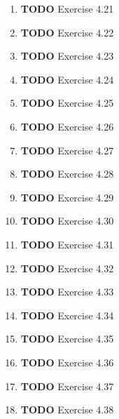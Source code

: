 \documentclass[11pt]{article}
\begin{document}
\begin{enumerate}
\begin{enumerate}
\item {\bfseries\sffamily TODO} Exercise 4.21
\label{sec:orgcb80988}

\item {\bfseries\sffamily TODO} Exercise 4.22
\label{sec:orgb987f28}

\item {\bfseries\sffamily TODO} Exercise 4.23
\label{sec:org85c966d}

\item {\bfseries\sffamily TODO} Exercise 4.24
\label{sec:orgdd5f2ce}

\item {\bfseries\sffamily TODO} Exercise 4.25
\label{sec:orgd80fada}

\item {\bfseries\sffamily TODO} Exercise 4.26
\label{sec:org2371de7}

\item {\bfseries\sffamily TODO} Exercise 4.27
\label{sec:orge171b40}

\item {\bfseries\sffamily TODO} Exercise 4.28
\label{sec:org1bc0853}

\item {\bfseries\sffamily TODO} Exercise 4.29
\label{sec:org37179b7}

\item {\bfseries\sffamily TODO} Exercise 4.30
\label{sec:org4f55e4c}

\item {\bfseries\sffamily TODO} Exercise 4.31
\label{sec:org8599291}

\item {\bfseries\sffamily TODO} Exercise 4.32
\label{sec:org86470d2}

\item {\bfseries\sffamily TODO} Exercise 4.33
\label{sec:org6365de0}

\item {\bfseries\sffamily TODO} Exercise 4.34
\label{sec:orge858066}

\item {\bfseries\sffamily TODO} Exercise 4.35
\label{sec:org0a099a0}

\item {\bfseries\sffamily TODO} Exercise 4.36
\label{sec:orgd140d75}

\item {\bfseries\sffamily TODO} Exercise 4.37
\label{sec:orgad3b778}

\item {\bfseries\sffamily TODO} Exercise 4.38
\label{sec:org5caccd3}


\end{enumerate}
\end{enumerate}
\end{document}
